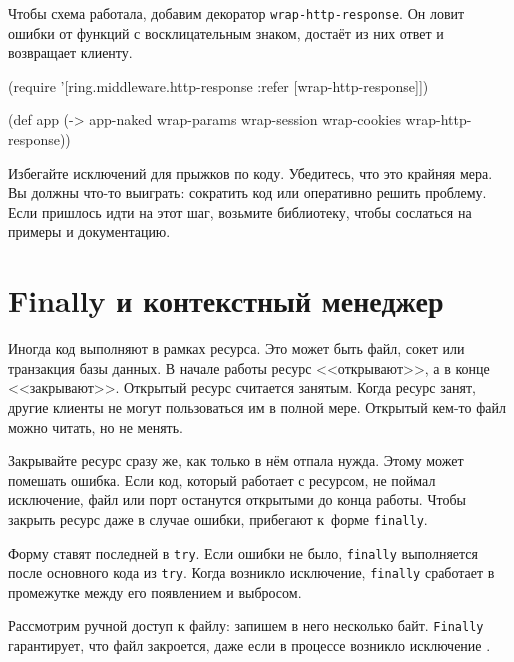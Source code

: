 
Чтобы схема работала, добавим декоратор \verb|wrap-http-response|. Он ловит
ошибки от функций с восклицательным знаком, достаёт из них ответ и
возвращает клиенту.

\begin{english}
  \begin{clojure}
(require '[ring.middleware.http-response
           :refer [wrap-http-response]])

(def app
  (-> app-naked
      wrap-params
      wrap-session
      wrap-cookies
      wrap-http-response))
  \end{clojure}
\end{english}

Избегайте исключений для прыжков по коду. Убедитесь, что это крайняя мера. Вы
должны что-то выиграть: сократить код или оперативно решить проблему. Если
пришлось идти на этот шаг, возьмите библиотеку, чтобы сослаться на примеры и
документацию.


\section{Finally и контекстный менеджер}

Иногда код выполняют в рамках ресурса. Это может быть файл, сокет или транзакция
базы данных. В начале работы ресурс <<открывают>>, а в конце
<<закрывают>>. Открытый ресурс считается занятым. Когда ресурс занят, другие
клиенты не могут пользоваться им в полной мере. Открытый кем-то файл можно
читать, но не менять.

Закрывайте ресурс сразу же, как только в нём отпала нужда. Этому может
помешать ошибка. Если код, который работает с ресурсом, не поймал исключение,
файл или порт останутся открытыми до конца работы. Чтобы закрыть ресурс даже в
случае ошибки, прибегают к~форме \verb|finally|.

Форму ставят последней в \verb|try|. Если ошибки не было, \verb|finally|
выполняется после основного кода из \verb|try|. Когда возникло исключение,
\verb|finally| сработает в промежутке между его появлением и выбросом.

Рассмотрим ручной доступ к файлу: запишем в него несколько
байт. \verb|Finally| гарантирует, что файл закроется, даже если в процессе
возникло исключение .

